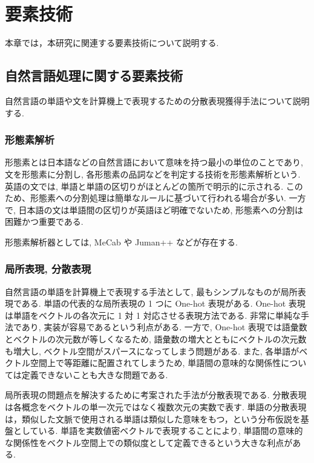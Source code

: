 \newpage
\changeindent{0cm}
\section{要素技術}
\changeindent{2cm}

本章では，本研究に関連する要素技術について説明する.

\changeindent{0cm}
\subsection{自然言語処理に関する要素技術}
\changeindent{2cm}

自然言語の単語や文を計算機上で表現するための分散表現獲得手法について説明する.

\changeindent{0cm}
\subsubsection{形態素解析}
\changeindent{2cm}

形態素とは日本語などの自然言語において意味を持つ最小の単位のことであり,
文を形態素に分割し, 各形態素の品詞などを判定する技術を形態素解析という.
英語の文では, 単語と単語の区切りがほとんどの箇所で明示的に示される.
このため、形態素への分割処理は簡単なルールに基づいて行われる場合が多い.
一方で, 日本語の文は単語間の区切りが英語ほど明確でないため,
形態素への分割は困難かつ重要である.

形態素解析器としては, MeCab \cite{mecab} や Juman++ \cite{jumanpp} などが存在する.

\changeindent{0cm}
\subsubsection{局所表現, 分散表現}
\changeindent{2cm}
自然言語の単語を計算機上で表現する手法として, 最もシンプルなものが局所表現である.
単語の代表的な局所表現の 1 つに One-hot 表現がある.
One-hot 表現は単語をベクトルの各次元に 1 対 1 対応させる表現方法である.
非常に単純な手法であり, 実装が容易であるという利点がある.
一方で, One-hot 表現では語彙数とベクトルの次元数が等しくなるため,
語彙数の増大とともにベクトルの次元数も増大し, ベクトル空間がスパースになってしまう問題がある.
また, 各単語がベクトル空間上で等距離に配置されてしまうため,
単語間の意味的な関係性については定義できないことも大きな問題である.

局所表現の問題点を解決するために考案された手法が分散表現である. 分散表現は各概念をベクトルの単一次元ではなく複数次元の実数で表す.
単語の分散表現は，類似した文脈で使用される単語は類似した意味をもつ，という分布仮説を基盤としている.
単語を実数値密ベクトルで表現することにより,
単語間の意味的な関係性をベクトル空間上での類似度として定義できるという大きな利点がある.

